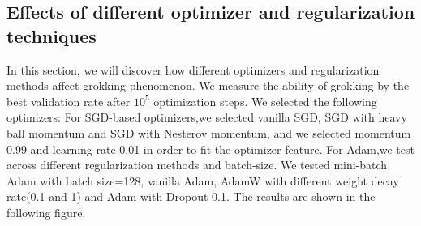 \documentclass{article}
\begin{document}
\subsection{Effects of different optimizer and regularization techniques}
\vspace{-1em}
In this section, we will discover how different optimizers and regularization methods affect grokking phenomenon. We measure the ability of grokking by the best validation rate after $10^5$  optimization steps. We selected the following optimizers: For SGD-based optimizers,we selected vanilla SGD, SGD with heavy ball momentum and SGD with Nesterov momentum, and we selected momentum 0.99 and learning rate 0.01 in order to fit the optimizer feature. For Adam,we test across different regularization methods and batch-size. We tested mini-batch Adam with batch size=128, vanilla Adam, AdamW with different weight decay rate(0.1 and 1) and Adam with Dropout 0.1. The results are shown in the following figure.
\end{document}
